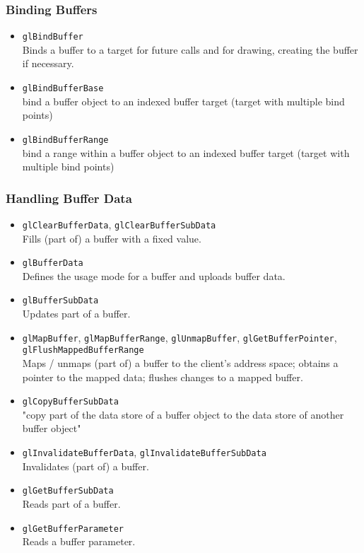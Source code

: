 \documentclass[12pt]{article}
\begin{document}
\subsubsection{Binding Buffers}
\begin{itemize}
\item \texttt{glBindBuffer} \\
	Binds a buffer to a target for future calls and for drawing, creating the buffer if necessary.
\item \texttt{glBindBufferBase} \\
	bind a buffer object to an indexed buffer target (target with multiple bind points)
\item \texttt{glBindBufferRange} \\
	bind a range within a buffer object to an indexed buffer target (target with multiple bind points)
\end{itemize}
	
\subsubsection{Handling Buffer Data}
\begin{itemize}
\item \texttt{glClearBufferData}, \texttt{glClearBufferSubData} \\
	Fills (part of) a buffer with a fixed value.
\item \texttt{glBufferData} \\
	Defines the usage mode for a buffer and uploads buffer data.
\item \texttt{glBufferSubData} \\
	Updates part of a buffer.
\item \texttt{glMapBuffer}, \texttt{glMapBufferRange}, \texttt{glUnmapBuffer}, \texttt{glGetBufferPointer}, \texttt{glFlushMappedBufferRange} \\
	Maps / unmaps (part of) a buffer to the client's address space; obtains a pointer to the mapped data; flushes changes to a mapped buffer.
\item \texttt{glCopyBufferSubData} \\
	"copy part of the data store of a buffer object to the data store of another buffer object"
\item \texttt{glInvalidateBufferData}, \texttt{glInvalidateBufferSubData} \\
	Invalidates (part of) a buffer.
\item \texttt{glGetBufferSubData} \\
	Reads part of a buffer.
\item \texttt{glGetBufferParameter} \\
	Reads a buffer parameter.
\end{itemize}
\end{document}
